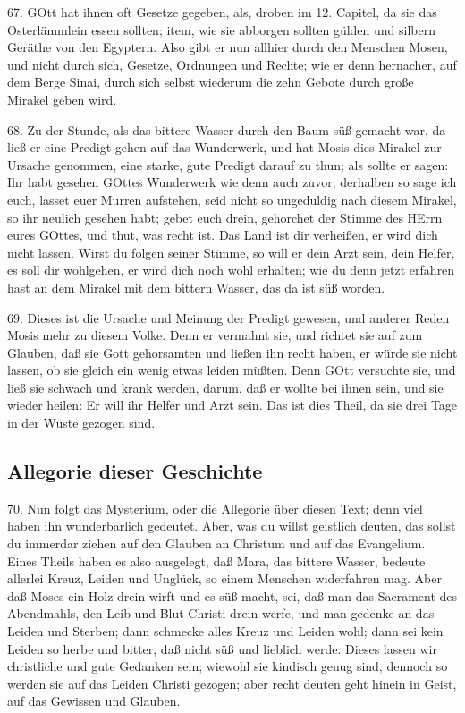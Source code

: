 67. GOtt hat ihnen oft Gesetze gegeben, als, droben im 12. Capitel, da sie das Osterlämmlein essen sollten; item, wie sie abborgen sollten gülden und silbern Geräthe von den Egyptern. Also gibt er nun allhier durch den Menschen Mosen, und nicht durch sich, Gesetze, Ordnungen und Rechte; wie er denn hernacher, auf dem Berge Sinai, durch sich selbst wiederum die zehn Gebote durch große Mirakel geben wird.

68. Zu der Stunde, als das bittere Wasser durch den Baum süß gemacht war, da ließ er eine Predigt gehen auf das Wunderwerk, und hat Mosis dies Mirakel zur Ursache genommen, eine starke, gute Predigt darauf zu thun; als sollte er sagen: Ihr habt gesehen GOttes Wunderwerk wie denn auch zuvor; derhalben so sage ich euch, lasset euer Murren aufstehen, seid nicht so ungeduldig nach diesem Mirakel, so ihr neulich gesehen habt; gebet euch drein, gehorchet der Stimme des HErrn eures GOttes, und thut, was recht ist. Das Land ist dir verheißen, er wird dich nicht lassen. Wirst du folgen seiner Stimme, so will er dein Arzt sein, dein Helfer, es soll dir wohlgehen, er wird dich noch wohl erhalten; wie du denn jetzt erfahren hast an dem Mirakel mit dem bittern Wasser, das da ist süß worden.

69. Dieses ist die Ursache und Meinung der Predigt gewesen, und anderer Reden Mosis mehr zu diesem Volke. Denn er vermahnt sie, und richtet sie auf zum Glauben, daß sie Gott gehorsamten und ließen ihn recht haben, er würde sie nicht lassen, ob sie gleich ein wenig etwas leiden müßten. Denn GOtt versuchte sie, und ließ sie schwach und krank werden, darum, daß er wollte bei ihnen sein, und sie wieder heilen: Er will ihr Helfer und Arzt sein. Das ist dies Theil, da sie drei Tage in der Wüste gezogen sind.

\subsection{Allegorie dieser Geschichte}

70. Nun folgt das Mysterium, oder die Allegorie über diesen Text; denn viel haben ihn wunderbarlich gedeutet. Aber, was du willst geistlich deuten, das sollst du immerdar ziehen auf den Glauben an Christum und auf das Evangelium. Eines Theils haben es also ausgelegt, daß Mara, das bittere Wasser, bedeute allerlei Kreuz, Leiden und Unglück, so einem Menschen widerfahren mag. Aber daß Moses ein Holz drein wirft und es süß macht, sei, daß man das Sacrament des Abendmahls, den Leib und Blut Christi drein werfe, und man gedenke an das Leiden und Sterben; dann schmecke alles Kreuz und Leiden wohl; dann sei kein Leiden so herbe und bitter, daß nicht süß und lieblich werde. Dieses lassen wir christliche und gute Gedanken sein; wiewohl sie kindisch genug sind, dennoch so werden sie auf das Leiden Christi gezogen; aber recht deuten geht hinein in Geist, auf das Gewissen und Glauben.

